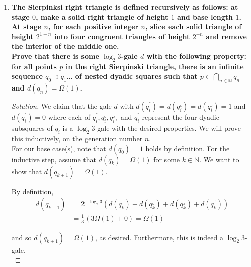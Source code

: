 \documentclass[11pt]{article}
\newenvironment{solution}
  {\renewcommand\qedsymbol{$\blacksquare$}\begin{proof}[Solution]}
  {\end{proof}}
\begin{document}
\begin{enumerate}
\begin{solution}
Clearly, since $\left\lfloor\frac{e}{n}\right\rfloor \leq \frac{e}{n}$, we find that
\[ \mathrm{Cr}(G) \leq e \left( \left\lfloor\frac{e}{n}\right\rfloor \right)^2 \leq e \left( \frac{e}{n}\right)^2 = \frac{e^3}{n^2}\]

as desired. 
\end{solution}

    \newpage
    
    \item \textbf{The Sierpinksi right triangle is defined recursively as follows: at stage $0$, make a solid right triangle of height $1$ and base length $1$. At stage $n$, for each positive integer $n$, slice each solid triangle of height $2^{1-n}$ into four congruent triangles of height $2^{-n}$ and remove the interior of the middle one.} \\
    
    \textbf{Prove that there is some $\log_2 3$-gale $d$ with the following property: for all points $p$ in the right Sierpinski triangle, there is an infinite sequence $q_0 \supset q_1 \dots $ of nested dyadic squares such that $p \in \bigcap_{n \in \mathbb{N}} q_n$ and $d(q_n) = \Omega(1)$.}

    \begin{solution}
    We claim that the gale $d$ with $d\left(q_{i}^{\ulcorner}\right) = d(q_{i}^{\llcorner}) = d(q_{i}^{\lrcorner}) = 1$ and $d\left(q_i^\urcorner\right) = 0$ where each of $q_{i}^{\ulcorner}, q_{i}^{\llcorner}, q_{i}^{\lrcorner},$ and $q_{i}^{\urcorner}$ represent the four dyadic subsquares of $q_i$ is a $\log_2 3$-gale with the desired properties. We will prove this inductively, on the generation number $n$. \\

    For our base case(s), note that $d(q_0) = 1$ holds by definition. For the inductive step, assume that $d(q_k) = \Omega(1)$ for some $k \in \mathbb{N}$. We want to show that $d(q_{k+1}) = \Omega(1).$ 
    
    By definition, \begin{align*} d(q_{k+1}) &= 2^{-\log_2 3} \left( d\left(q_{k}^{\ulcorner}\right) + d(q_{k}^{\llcorner}) + d(q_{k}^{\lrcorner}) + d\left(q_{k}^{\urcorner}\right)\right) \\
    &= \frac{1}{3} (3 \Omega(1) + 0) = \Omega(1) \end{align*}

    and so $d(q_{k+1}) = \Omega(1)$, as desired. Furthermore, this is indeed a $\log_2 3$-gale. \\
    

\end{solution}
\end{enumerate}
\end{document}
